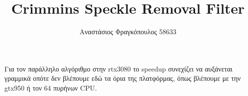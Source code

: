 \documentclass[12pt]{article}
\begin{document}
\title{Crimmins Speckle Removal Filter}
\author{Αναστάσιος Φραγκόπουλος 58633}
\date{}




\tableofcontents
\newpage







Για τον παράλληλο αλγόριθμο στην rtx3080 το speedup συνεχίζει να αυξάνεται γραμμικά οπότε δεν βλέπουμε εδώ τα όρια της πλατφόρμας, όπως βλέπουμε με την gtx950 ή τον 64 πυρήνων CPU.

\vspace{1.5em}
\nocite{*}
\printbibliography
{}
\end{document}
